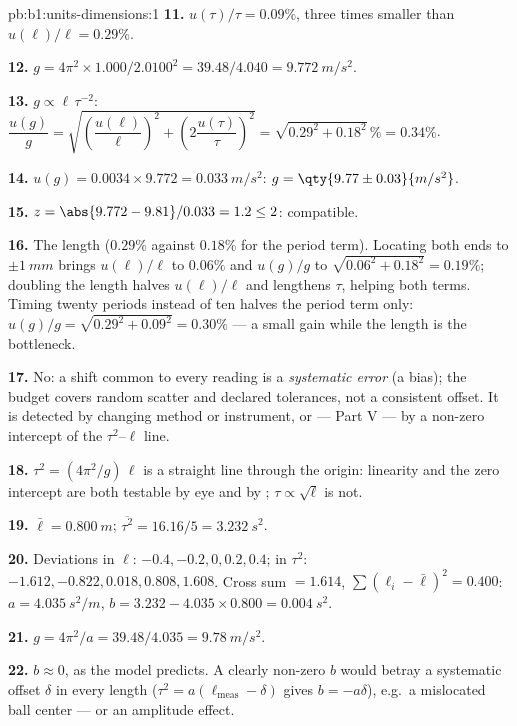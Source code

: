\begin{solution}{pb:b1:units-dimensions:1}
\textbf{11.} $u(\tau)/\tau = 0.09\%$, three times smaller than
$u(\ell)/\ell = 0.29\%$.

\textbf{12.} $g = 4\pi^2 \times 1.000/2.0100^2 = 39.48/4.040 =
\qty{9.772}{m/s^2}$.

\textbf{13.} $g \propto \ell\,\tau^{-2}$:
$\dfrac{u(g)}{g} = \sqrt{\left(\dfrac{u(\ell)}{\ell}\right)^2
+ \left(2\dfrac{u(\tau)}{\tau}\right)^2} = \sqrt{0.29^2 + 0.18^2}\,\%
= 0.34\%$.

\textbf{14.} $u(g) = 0.0034 \times 9.772 = \qty{0.033}{m/s^2}$:
$g = \qty{9.77\pm0.03}{m/s^2}$.

\textbf{15.} $z = \abs{9.772 - 9.81}/0.033 = 1.2 \leq 2$: compatible.

\textbf{16.} The length ($0.29\%$ against $0.18\%$ for the period term).
Locating both ends to $\pm\qty{1}{mm}$ brings $u(\ell)/\ell$ to
$0.06\%$ and $u(g)/g$ to $\sqrt{0.06^2 + 0.18^2} = 0.19\%$; doubling
the length halves $u(\ell)/\ell$ and lengthens $\tau$, helping both
terms. Timing twenty periods instead of ten halves the period term
only: $u(g)/g = \sqrt{0.29^2 + 0.09^2} = 0.30\%$ --- a small gain while
the length is the bottleneck.

\textbf{17.} No: a shift common to every reading is a
\emph{systematic error} (a bias); the budget covers random scatter and
declared tolerances, not a consistent offset. It is detected by
changing method or instrument, or --- Part V --- by a non-zero
intercept of the $\tau^2$--$\ell$ line.

\textbf{18.} $\tau^2 = (4\pi^2/g)\,\ell$ is a straight line through the
origin: linearity and the zero intercept are both testable by eye and
by ; $\tau \propto \sqrt\ell$ is not.

\textbf{19.} $\bar\ell = \qty{0.800}{m}$; $\overline{\tau^2} = 16.16/5 =
\qty{3.232}{s^2}$.

\textbf{20.} Deviations in $\ell$: $-0.4, -0.2, 0, 0.2, 0.4$; in
$\tau^2$: $-1.612, -0.822, 0.018, 0.808, 1.608$. Cross sum $= 1.614$,
$\sum(\ell_i - \bar\ell)^2 = 0.400$: $a = \qty{4.035}{s^2/m}$,
$b = 3.232 - 4.035 \times 0.800 = \qty{0.004}{s^2}$.

\textbf{21.} $g = 4\pi^2/a = 39.48/4.035 = \qty{9.78}{m/s^2}$.

\textbf{22.} $b \approx 0$, as the model predicts. A clearly non-zero
$b$ would betray a systematic offset $\delta$ in every length
($\tau^2 = a(\ell_{\text{meas}} - \delta)$ gives $b = -a\delta$), e.g.\ a
mislocated ball center --- or an amplitude effect.


\end{solution}
